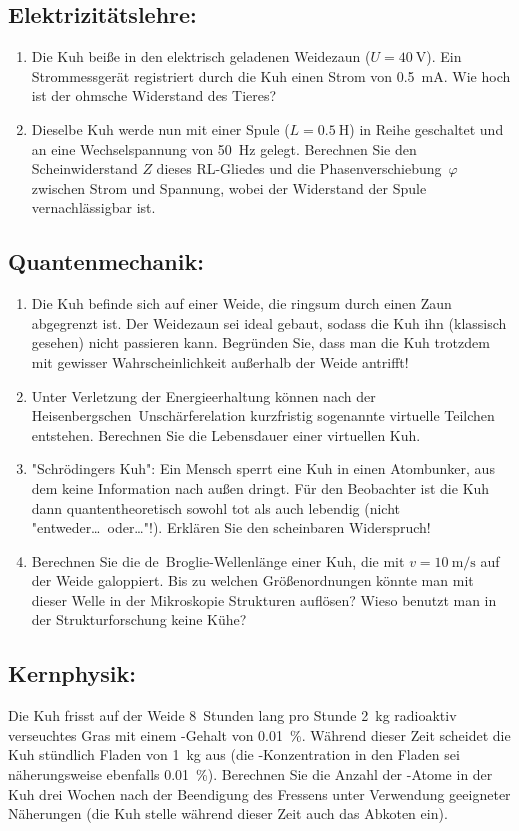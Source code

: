 \subsection[Elektrizitätslehre]{Elektrizitätslehre:}
\begin{enumerate}[leftmargin=0.5cm]
	\item Die Kuh beiße in den elektrisch geladenen Weidezaun ($U = \SI{40}{\V}$).
	Ein Strommessgerät registriert durch die Kuh einen Strom von \SI{0,5}{\mA}. Wie hoch ist der ohmsche Widerstand des Tieres?
	\item Dieselbe Kuh werde nun mit einer Spule ($L = \SI{0,5}{\henry}$) in Reihe geschaltet und an eine Wechselspannung von \SI{50}{\Hz} gelegt.
	Berechnen Sie den Scheinwiderstand $Z$ dieses RL-Gliedes und die Phasenverschiebung~$\varphi$ zwischen Strom und Spannung, wobei der Widerstand der Spule vernachlässigbar ist.
\end{enumerate}

\subsection[Quantenmechanik]{Quantenmechanik:}
\begin{enumerate}[leftmargin=0.5cm]
	\item Die Kuh befinde sich auf einer Weide, die ringsum durch einen Zaun abgegrenzt ist.
	Der Weidezaun sei ideal gebaut, sodass die Kuh ihn (klassisch gesehen) nicht passieren kann. Begründen Sie, dass man die Kuh trotzdem mit gewisser Wahrscheinlichkeit außerhalb der Weide antrifft!
	\item Unter Verletzung der Energieerhaltung können nach der Heisenbergschen~Unschärferelation kurzfristig sogenannte virtuelle Teilchen entstehen.
	Berechnen Sie die Lebensdauer einer virtuellen Kuh.
	\item "Schrödingers Kuh": Ein Mensch sperrt eine Kuh in einen Atombunker, aus dem keine Information nach außen dringt.
	Für den Beobachter ist die Kuh dann quantentheoretisch sowohl tot als auch lebendig (nicht "entweder\dots\ oder\dots"!).
	Erklären Sie den scheinbaren Widerspruch!
	\item Berechnen Sie die de~Broglie-Wellenlänge einer Kuh, die mit $v = \SI{10}{\m\per\s}$ auf der Weide galoppiert.
	Bis zu welchen Größenordnungen könnte man mit dieser Welle in der Mikroskopie Strukturen auflösen?
	Wieso benutzt man in der Strukturforschung keine Kühe?
\end{enumerate}

\subsection[Kernphysik]{Kernphysik:}
Die Kuh frisst auf der Weide 8~Stunden lang pro Stunde \SI{2}{\kg} radioaktiv verseuchtes Gras mit einem -Gehalt von \SI{0,01}{\percent}.
Während dieser Zeit scheidet die Kuh stündlich Fladen von \SI{1}{\kg} aus (die -Konzentration in den Fladen sei näherungsweise ebenfalls \SI{0,01}{\percent}).
Berechnen Sie die Anzahl der -Atome in der Kuh drei Wochen nach der Beendigung des Fressens unter Verwendung geeigneter Näherungen (die Kuh stelle während dieser Zeit auch das Abkoten ein).

\vspace{-0.6cm}
